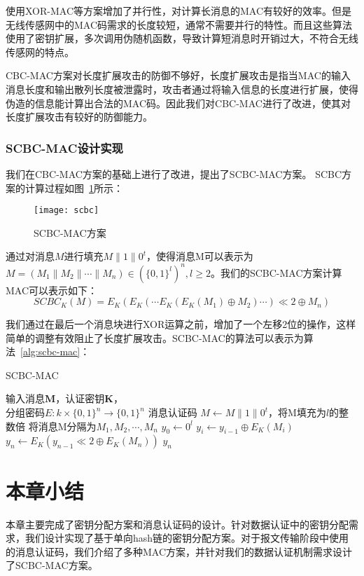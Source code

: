 使用XOR-MAC等方案增加了并行性，对计算长消息的MAC有较好的效率。但是无线传感网中的MAC码需求的长度较短，通常不需要并行的特性。而且这些算法使用了密钥扩展，多次调用伪随机函数，导致计算短消息时开销过大，不符合无线传感网的特点。

CBC-MAC方案对长度扩展攻击的防御不够好，长度扩展攻击是指当MAC的输入消息长度和输出散列长度被泄露时，攻击者通过将输入信息的长度进行扩展，使得伪造的信息能计算出合法的MAC码。因此我们对CBC-MAC进行了改进，使其对长度扩展攻击有较好的防御能力。

\subsubsection{SCBC-MAC设计实现}
我们在CBC-MAC方案的基础上进行了改进，提出了SCBC-MAC方案。
SCBC方案的计算过程如图~\ref{fig:scbc}所示：

\begin{figure}[htbp]
  \centering
  \texttt{[image: scbc]}
  \caption{SCBC-MAC方案}
  \label{fig:scbc}
\end{figure}

通过对消息$M$进行填充$M\| 1\|0^t$，使得消息M可以表示为$M=(M_1\|M_2\| \cdots \| M_n)\in (\{0,1\}^l)^n,l\geq 2$。我们的SCBC-MAC方案计算MAC可以表示如下：
\begin{equation}\label{scbc}
  SCBC_K(M)=E_K(E_K(\cdots E_K(E_K(M_1)\oplus M_2) \cdots)\ll 2 \oplus M_n)
\end{equation}

我们通过在最后一个消息块进行XOR运算之前，增加了一个左移2位的操作，这样简单的调整有效阻止了长度扩展攻击。SCBC-MAC的算法可以表示为算法~\ref{alg:scbc-mac}：

\begin{algorithm}[htbp]
  \caption{SCBC-MAC}
  \label{alg:scbc-mac}
  \begin{algorithmic}[1]
    \REQUIRE 输入消息$\mathbf{M}$，认证密钥$\mathbf{K}$，\\
            分组密码$E:k\times \{0,1\}^n \rightarrow \{0,1\}^n$
    \ENSURE 消息认证码
    \STATE $M \leftarrow M\| 1\|0^t$，将M填充为$l$的整数倍
        \STATE 将消息M分隔为$M_1,M_2,\cdots,M_n$
    \ENDIF
    \STATE $y_0\leftarrow 0^l$
        \STATE $y_i \leftarrow y_{i-1}\oplus E_K(M_i)$
    \ENDFOR
    \STATE $y_n \leftarrow E_K(y_{n-1}\ll 2 \oplus E_K(M_n))$
    \RETURN $y_n$
  \end{algorithmic}
\end{algorithm}


\section{本章小结}
本章主要完成了密钥分配方案和消息认证码的设计。针对数据认证中的密钥分配需求，我们设计实现了基于单向hash链的密钥分配方案。对于报文传输阶段中使用的消息认证码，我们介绍了多种MAC方案，并针对我们的数据认证机制需求设计了SCBC-MAC方案。
